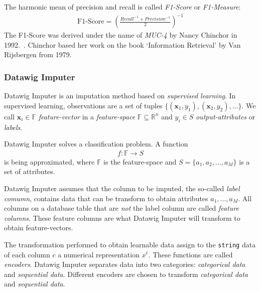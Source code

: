 The harmonic mean of precision and recall is called \emph{F1-Score} or \emph{F1-Measure}:
\begin{align}\label{eq:f1-score}
\text{F1-Score} = {\left(\frac{Recall^{-1} + Precision^{-1}}{2}\right)}^{-1}
\end{align}
The F1-Score was derived under the name of \emph{MUC-4} by Nancy Chinchor in 1992.~\cite{CHI92}.
Chinchor based her work on the book `Information Retrieval' by Van Rijsbergen from 1979.~\cite{RIJ79}

\subsubsection{Datawig Imputer}
Datawig Imputer is an imputation method based on \emph{supervised learning}.
In supervised learning, observations are a set of tuples \( \{\left(\mathbold{x}_1, y_1\right),\left(\mathbold{x}_2, y_2\right), \dots \} \).
We call \( \mathbold{x}_i \in \mathbb{F}\) \emph{feature-vector} in a \emph{feature-space} \( \mathbb{F} \subseteq \mathbb{R}^{n} \) and \( y_i \in S \) \emph{output-attributes} or \emph{labels}.\cite[p.19]{DUD00}

Datawig Imputer solves a classification problem.
A function
\begin{align}
    f: \mathbb{F} \rightarrow S
\end{align}
is being approximated, where \( \mathbb{F} \) is the feature-space and \( S = \{a_1, a_2, \dots, a_M \} \) is a set of attributes.

Datawig Imputer assumes that the column to be imputed, the so-called \emph{label comumn}, contains data that can be transform to obtain attributes \( a_1, \dots, a_M \).\cite[p.2]{BIE18}
All columns on a database table that are \emph{not} the label column are called \emph{feature columns}.
These feature columns are what Datawig Imputer will transform to obtain feature-vectors.

The transformation performed to obtain learnable data assign to the \texttt{string} data of each column \( c \) a numerical representation \( x^c \).
These functions are called \emph{encoders}.
Datawig Imputer separates data into two categories: \emph{categorical data} and \emph{sequential data}.
Different encoders are chosen to transform \emph{categorical data} and \emph{sequential data}.

